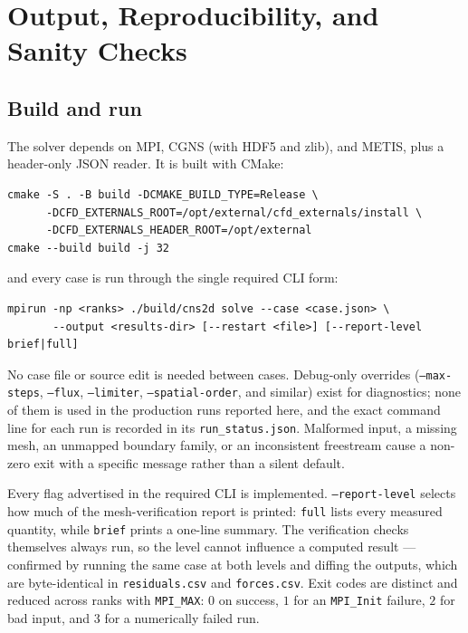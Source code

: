 \section{Output, Reproducibility, and Sanity Checks}
\label{sec:verification}

\subsection{Build and run}

The solver depends on MPI, CGNS (with HDF5 and zlib), and METIS, plus a
header-only JSON reader. It is built with CMake:

\begin{verbatim}
cmake -S . -B build -DCMAKE_BUILD_TYPE=Release \
      -DCFD_EXTERNALS_ROOT=/opt/external/cfd_externals/install \
      -DCFD_EXTERNALS_HEADER_ROOT=/opt/external
cmake --build build -j 32
\end{verbatim}

and every case is run through the single required CLI form:

\begin{verbatim}
mpirun -np <ranks> ./build/cns2d solve --case <case.json> \
       --output <results-dir> [--restart <file>] [--report-level brief|full]
\end{verbatim}

No case file or source edit is needed between cases. Debug-only overrides
(\texttt{--max-steps}, \texttt{--flux}, \texttt{--limiter},
\texttt{--spatial-order}, and similar) exist for diagnostics; none of them is
used in the production runs reported here, and the exact command line for each
run is recorded in its \texttt{run\_status.json}. Malformed input, a missing
mesh, an unmapped boundary family, or an inconsistent freestream cause a
non-zero exit with a specific message rather than a silent default.

Every flag advertised in the required CLI is implemented. \texttt{--report-level}
selects how much of the mesh-verification report is printed: \texttt{full} lists
every measured quantity, while \texttt{brief} prints a one-line summary. The
verification checks themselves always run, so the level cannot influence a computed
result --- confirmed by running the same case at both levels and diffing the
outputs, which are byte-identical in \texttt{residuals.csv} and
\texttt{forces.csv}. Exit codes are distinct and reduced across ranks with
\texttt{MPI\_MAX}: $0$ on success, $1$ for an \texttt{MPI\_Init} failure, $2$ for
bad input, and $3$ for a numerically failed run.

